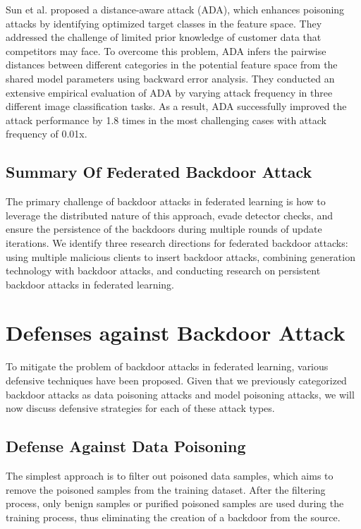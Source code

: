 \documentclass[conference]{IEEEtran}
\begin{document}
Sun et al. \cite{b65}proposed a distance-aware attack (ADA), which enhances poisoning attacks
by identifying optimized target classes in the feature space. They addressed the challenge of
limited prior knowledge of customer data that competitors may face. To overcome this problem,
ADA infers the pairwise distances between different categories in the potential feature space
from the shared model parameters using backward error analysis. They conducted an extensive
empirical evaluation of ADA by varying attack frequency in three different image classification
tasks. As a result, ADA successfully improved the attack performance by 1.8 times in the most
challenging cases with attack frequency of 0.01x.

\subsection{Summary Of Federated Backdoor Attack}
The primary challenge of backdoor attacks in federated learning is how
to leverage the distributed nature of this approach, evade detector checks,
and ensure the persistence of the backdoors during multiple rounds of update
iterations. We identify three research directions for federated backdoor
attacks: using multiple malicious clients to insert backdoor attacks,
combining generation technology with backdoor attacks, and conducting
research on persistent backdoor attacks in federated learning.

\section{Defenses against Backdoor Attack}
To mitigate the problem of backdoor attacks in
federated learning, various defensive techniques have been proposed.
Given that we previously categorized backdoor attacks as data poisoning
attacks and model poisoning attacks, we will now discuss defensive strategies
for each of these attack types.

\subsection{Defense Against Data Poisoning}
The simplest approach is to filter out poisoned data samples,
which aims to remove the poisoned samples from the training dataset.
After the filtering process, only benign samples or purified poisoned
samples are used during the training process, thus eliminating the
creation of a backdoor from the source.
\end{document}
